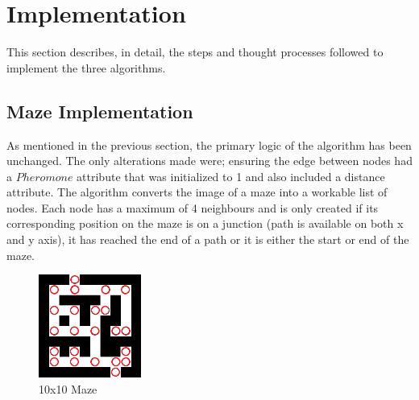 \documentclass[conference]{IEEEtran}
\begin{document}
\section{Implementation}
    This section describes, in detail, the steps and thought processes followed to implement the three algorithms.
    \subsection{Maze Implementation}
        As mentioned in the previous section, the primary logic of the algorithm has been unchanged. The only alterations made were; ensuring the edge between nodes had a $Pheromone$ attribute that was initialized to 1 and also included a distance attribute.
        The algorithm converts the image of a maze into a workable list of nodes. Each node has a maximum of 4 neighbours and is only created if its corresponding position on the maze is on a junction (path is available on both x and y axis), it has reached the end of a path or it is either the start or end of the maze.
        \begin{figure}[h]
        \centering
        \includegraphics[width=0.3\textwidth]{maze_grid}
        \caption{10x10 Maze}
        \end{figure}
\end{document}
